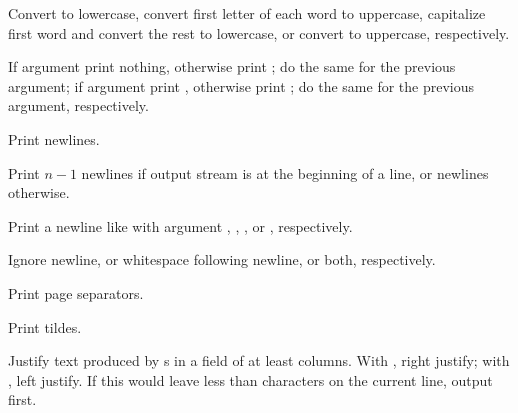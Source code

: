 \begin{LIST}{1cm}
\begin{LIST}{.5cm}
    {%
      Convert  to lowercase, convert first letter of each word
      to uppercase, capitalize first word and convert the rest to
      lowercase, or convert to uppercase, respectively. 
    }

    {%
      If argument   print nothing, otherwise print ;
      do the same for the previous argument; if argument  
      print , otherwise print ; do the same for the
      previous argument, respectively.  
    }

    {%
      Print  newlines.
    }

    {%
      Print $n-1$ newlines if output stream is at the
      beginning of a line, or  newlines otherwise.
    }

    {%
      Print a newline like  with argument
      , , , or , respectively.
    }

    \IT{\Goo{\KWD{\TLD:$\hookleftarrow$}\XOR\KWD{\TLD@$\hookleftarrow$}\XOR\KWD{\TLD$\hookleftarrow$}}}
    {%
       Ignore newline, or whitespace following
      newline, or both, respectively.
    }

    {%
      Print  page separators.
    }

    {%
      Print  tildes.
    }

    {%
      Justify text produced by s in a field of at least
       columns. With \kwd{:}, right justify; with ,
      left justify. If this would leave less than  characters
      on the current line, output  first.
    }


\end{LIST}
\end{LIST}
